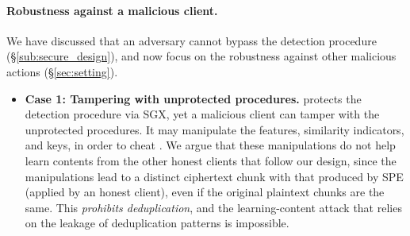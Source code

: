 \paragraph{Robustness against a malicious client.}
We have discussed that an adversary cannot bypass the detection procedure (\S\ref{sub:secure_design}), and now focus on the robustness against other malicious actions (\S\ref{sec:setting}).


\begin{itemize}[leftmargin=*]
\item  {\bf Case 1: Tampering with unprotected procedures.}
  \sysnameF protects the detection procedure via SGX, yet a malicious client can tamper with the unprotected procedures. It may manipulate the features, similarity indicators, and keys, in order to cheat \sysnameF.
  We argue that these manipulations do not help learn contents from the other honest clients that follow our design, since the manipulations lead to a distinct ciphertext chunk with that produced by SPE (applied by an honest client), even if the original plaintext chunks are the same. This {\em prohibits deduplication}, and the learning-content attack that relies on the leakage of deduplication patterns is impossible.









\end{itemize}
